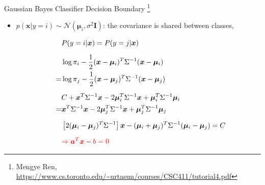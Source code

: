 \documentclass[12pt]{beamer}
\begin{document}
\begin{frame}{Gaussian Bayes Classifier Decision Boundary \footnote{\scriptsize{Mengye Ren, \url{https://www.cs.toronto.edu/~urtasun/courses/CSC411/tutorial4.pdf}}}}
\begin{itemize}
	\item $p(\bm{x}|y=i) \sim \mathcal{N}(\bm{\mu}_i,\sigma^2\mathbf{I})$: the covariance is shared between classes,
	\begin{small}
	\begin{equation} \nonumber
	\begin{aligned}
	&P(y=i|\bm{x}) = P(y=j|\bm{x}) \\[6pt]
	&\log \pi_{i} -\frac{1}{2}(\bm{x}-\bm{\mu}_i)^T \Sigma^{-1}(\bm{x}-\bm{\mu}_i) \\
	=& \log \pi_{j} -\frac{1}{2}(\bm{x}-\bm{\mu}_j)^T \Sigma^{-1}(\bm{x}-\bm{\mu}_j) \\[6pt]
	&C+\bm{x}^T\Sigma^{-1}\bm{x}-2\bm{\mu}_i^{T}\Sigma^{-1}\bm{x}+\bm{\mu}_i^{T}\Sigma^{-1}\bm{\mu}_{i} \\
	~~=&\bm{x}^T\Sigma^{-1}\bm{x}-2\bm{\mu}_j^{T}\Sigma^{-1}\bm{x}+\bm{\mu}_j^{T}\Sigma^{-1}\bm{\mu}_{j} \\[6pt]
	&\left[ 2(\bm{\mu}_i-\bm{\mu}_j)^T \Sigma^{-1} \right]\bm{x}-(\bm{\mu}_i+\bm{\mu}_j)^{T}\Sigma^{-1}(\bm{\mu}_i-\bm{\mu}_j)=C \\[6pt]
	& \textcolor{red}{\Rightarrow \bm{a}^{T}\bm{x}-b=0}
	\end{aligned}
	\end{equation}
	\end{small}
\end{itemize}
\end{frame}
\end{document}
